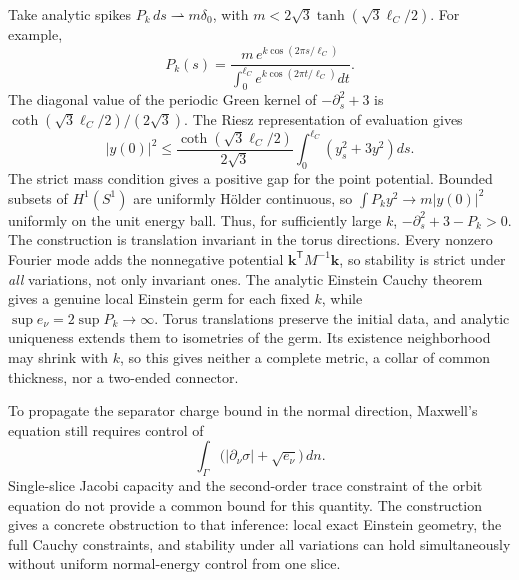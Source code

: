 \documentclass[a4paper,11pt]{article}
\numberwithin{equation}{section}
\theoremstyle{definition}
\begin{document}
Take analytic spikes $P_k\,ds\rightharpoonup m\delta_0$, with
$m<2\sqrt3\tanh(\sqrt3\ell_C/2)$.
For example,
\[
 P_k(s)=\frac{m\,e^{k\cos(2\pi s/\ell_C)}}
                 {\int_0^{\ell_C}e^{k\cos(2\pi t/\ell_C)}dt}.
\]
The diagonal value of the periodic Green kernel of $-\partial_s^2+3$ is
$\coth(\sqrt3\ell_C/2)/(2\sqrt3)$.
The Riesz representation of evaluation gives
\[
 |y(0)|^2\le
 \frac{\coth(\sqrt3\ell_C/2)}{2\sqrt3}
 \int_0^{\ell_C}(y_s^2+3y^2)ds.
\]
The strict mass condition gives a positive gap for the point potential.
Bounded subsets of $H^1(S^1)$ are uniformly H\"older continuous, so $\int P_ky^2\to m|y(0)|^2$ uniformly on the unit energy ball.
Thus, for sufficiently large $k$,
$-\partial_s^2+3-P_k>0$.
The construction is translation invariant in the torus directions.
Every nonzero Fourier mode adds the nonnegative potential $\mathbf k^{\mathsf T}M^{-1}\mathbf k$, so stability is strict under \emph{all} variations, not only invariant ones.
The analytic Einstein Cauchy theorem gives a genuine local Einstein germ for each fixed $k$, while $\sup e_\nu=2\sup P_k\to\infty$.
Torus translations preserve the initial data, and analytic uniqueness extends them to isometries of the germ.
Its existence neighborhood may shrink with $k$, so this gives neither a complete metric, a collar of common thickness, nor a two-ended connector.

To propagate the separator charge bound in the normal direction, Maxwell's equation still requires control of
\[
 \int_\Gamma\bigl(|\partial_\nu\sigma|+\sqrt{e_\nu}\bigr)\,dn.
\]
Single-slice Jacobi capacity and the second-order trace constraint of the orbit equation do not provide a common bound for this quantity.
The construction gives a concrete obstruction to that inference: local exact Einstein geometry, the full Cauchy constraints, and stability under all variations can hold simultaneously without uniform normal-energy control from one slice.
\end{document}
